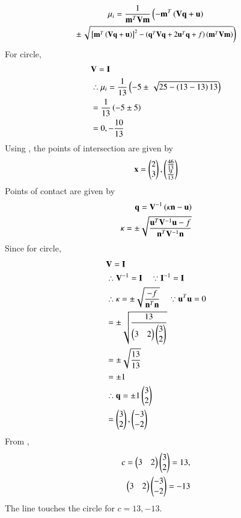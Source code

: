 \documentclass[journal,12pt,twocolumn]{IEEEtran}
\begin{document}
\begin{multline}
\mu_i = \frac{1}
{
\mathbf{m}^T\mathbf{V}\mathbf{m}
}
\left(-\mathbf{m}^T\left(\mathbf{V}\mathbf{q}+\mathbf{u}\right)\right.
\\
\pm
{\small
\ensuremath{\left.\sqrt{
{}\left[
\mathbf{m}^T\left(\mathbf{V}\mathbf{q}+\mathbf{u}\right)
\right]^2
-
\left(
\mathbf{q}^T\mathbf{V}\mathbf{q} + 2\mathbf{u}^T\mathbf{q} +f
\right)
\left(\mathbf{m}^T\mathbf{V}\mathbf{m}\right)
}
\right)}
}
\end{multline}
For circle,
\begin{align}
    &\mathbf V = \mathbf I\\ 
    & \therefore \mu_i = \frac{1}{13}\left(-5 \pm \left.\sqrt{25- \left(13-13\right)13}
    \right)
    \right.\\
    & = \frac{1}{13}\left(-5 \pm 5\right)\\
    & = 0, -\frac{10}{13}
\end{align}
Using \brak{\ref{points of intersection}}, the points of intersection are given by
\begin{align}
    \mathbf x = \begin{pmatrix}2\\3\end{pmatrix} , \begin{pmatrix}\frac{46}{13}\\ \frac{9}{13}\end{pmatrix}
\end{align}
Points of contact are given by
\begin{align}
    \mathbf q = \mathbf V^{-1} \left(\kappa \mathbf n - \mathbf u\right)\\
    \kappa = \pm \sqrt{\frac{\mathbf u^T \mathbf V^{-1} \mathbf u -f}{\mathbf n^T \mathbf V^{-1} \mathbf n}}
\end{align}
Since for circle,
\begin{align}
    &\mathbf V= \mathbf I\\
    &\therefore \mathbf V^{-1} = \mathbf I \quad \because \mathbf I^{-1}
    = \mathbf I\\
    &\therefore \kappa =\pm  \sqrt{\frac{-f}{\mathbf n^T \mathbf n}}\quad\because \mathbf u^T\mathbf u= 0\\
    & = \pm \sqrt{\frac{13}{\begin{pmatrix}3 & 2\end{pmatrix}\begin{pmatrix}3\\2\end{pmatrix}}}\\
    & = \pm \sqrt{\frac{13}{13}}\\
    & = \pm 1\\
    &\therefore \mathbf q = \pm 1\begin{pmatrix}3\\2\end{pmatrix}\\
    & = \begin{pmatrix}3\\2\end{pmatrix}, \begin{pmatrix}-3\\-2\end{pmatrix}
\end{align}
From \brak{\ref{tangent}},
\begin{align}
    c = \begin{pmatrix}3 & 2\end{pmatrix}\begin{pmatrix}3\\2\end{pmatrix} = 13, \\ \begin{pmatrix}3&2\end{pmatrix}\begin{pmatrix}-3\\-2\end{pmatrix}=-13
\end{align}
The line \brak{\ref{tangent}} touches the circle for $c = 13, -13$.
\end{document}

